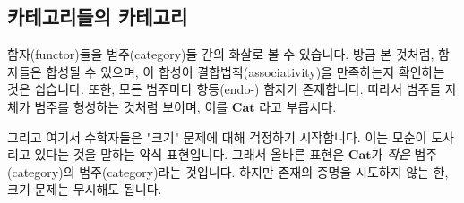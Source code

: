 \documentclass[DaoFP]{subfiles}
\begin{document}
\subsection{카테고리들의 카테고리}

함자(functor)들을 범주(category)들 간의 화살로 볼 수 있습니다. 방금 본 것처럼, 함자들은 합성될 수 있으며, 이 합성이 결합법칙(associativity)을 만족하는지 확인하는 것은 쉽습니다. 또한, 모든 범주마다 항등(endo-) 함자가 존재합니다. 따라서 범주들 자체가 범주를 형성하는 것처럼 보이며, 이를 $\mathbf{Cat}$ 라고 부릅시다.

그리고 여기서 수학자들은 "크기" 문제에 대해 걱정하기 시작합니다. 이는 모순이 도사리고 있다는 것을 말하는 약식 표현입니다. 그래서 올바른 표현은 $\mathbf{Cat}$가 \emph{작은} 범주(category)의 범주(category)라는 것입니다. 하지만 존재의 증명을 시도하지 않는 한, 크기 문제는 무시해도 됩니다.
\end{document}
